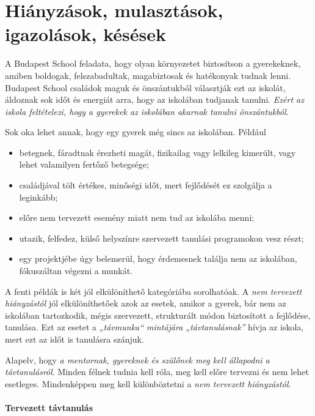 \hypertarget{hianyzasok-mulasztasok-igazolasok-kesesek}{%
\section{Hiányzások, mulasztások, igazolások,
késések}\label{hianyzasok-mulasztasok-igazolasok-kesesek}}

A Budapest School feladata, hogy olyan környezetet biztosítson a
gyerekeknek, amiben boldogak, felszabadultak, magabiztosak és hatékonyak
tudnak lenni. Budapest School családok maguk és önszántukból választják
ezt az iskolát, áldoznak sok időt és energiát arra, hogy az iskolában
tudjanak tanulni. \emph{Ezért az iskola feltételezi, hogy a gyerekek az
iskolában akarnak tanulni önszántukból}.

Sok oka lehet annak, hogy egy gyerek még sincs az iskolában. Például

\begin{itemize}
\item
  betegnek, fáradtnak érezheti magát, fizikailag vagy lelkileg kimerült,
  vagy lehet valamilyen fertőző betegsége;
\item
  családjával tölt értékes, minőségi időt, mert fejlődését ez szolgálja
  a leginkább;
\item
  előre nem tervezett esemény miatt nem tud az iskolába menni;
\item
  utazik, felfedez, külső helyszínre szervezett tanulási programokon
  vesz részt;
\item
  egy projektjébe úgy belemerül, hogy érdemesnek találja nem az
  iskolában, fókuszáltan végezni a munkát.
\end{itemize}

A fenti példák is két jól elkülöníthető kategóriába sorolhatóak. A
\emph{nem tervezett hiányzástól} jól elkülöníthetőek azok az esetek,
amikor a gyerek, bár nem az iskolában tartozkodik, mégis szervezett,
strukturált módon biztosított a fejlődése, tanulása. Ezt az esetet a
\emph{„távmunka``\emph{ mintájára }„távtanulásnak''} hívja az iskola,
mert ezt az időt is tanulásra szánjuk.

Alapelv, hogy \emph{a mentornak, gyereknek és szülőnek meg kell
állapodni a távtanulásról}. Minden félnek tudnia kell róla, meg kell
előre tervezni és nem lehet esetleges. Mindenképpen meg kell
különböztetni a \emph{nem tervezett hiányzástól}.

\hypertarget{tervezett-tavtanulas}{%
\paragraph{Tervezett távtanulás}\label{tervezett-tavtanulas}}

